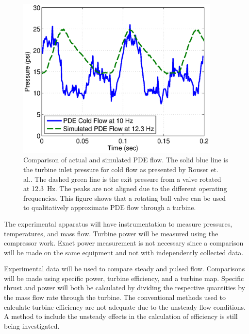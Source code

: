 \documentclass[12pt, letterpaper]{article}
\begin{document}
\begin{figure}[htbp] %
   \centering
   \includegraphics[trim = 0mm 0mm 0mm 0mm,clip,width=4in]{pressure.eps}
   \caption{Comparison of actual and simulated PDE flow. The solid blue line is the turbine inlet pressure for cold flow as presented by Rouser et. al.. The dashed green line is the exit pressure from a valve rotated at 12.3~Hz. The peaks are not aligned due to the different operating frequencies. This figure shows that a rotating ball valve can be used to qualitatively approximate PDE flow through a turbine.}
   \label{fig:pressurecomparison}
\end{figure}

The experimental apparatus will have instrumentation to measure pressures, temperatures, and mass flow.
Turbine power will be measured using the compressor work. Exact power measurement is not necessary since a comparison will be made on the same equipment and not with independently collected data.

Experimental data will be used to compare steady and pulsed flow. Comparisons will be made using specific power, turbine efficiency, and a turbine map. Specific thrust and power will both be calculated by dividing the respective quantities by the mass flow rate through the turbine. The conventional methods used to calculate turbine efficiency are not adequate due to the unsteady flow conditions. A method to include the unsteady effects in the calculation of efficiency is still being investigated.
\end{document}
